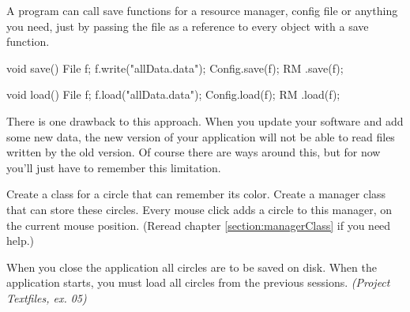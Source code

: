 A program can call save functions for a resource manager, config file or anything you need, just by passing the file as a reference to every object with a save function. 

\begin{code}
void save() {
  File f;
	f.write("allData.data");
	Config.save(f);
	RM    .save(f);
}

void load() {
	File f;
	f.load("allData.data");
	Config.load(f);
	RM    .load(f);
}
\end{code}

\begin{note}
There is one drawback to this approach. When you update your software and add some new data, the new version of your application will not be able to read files written by the old version. Of course there are ways around this, but for now you'll just have to remember this limitation.
\end{note}

\begin{exercise}
Create a class for a circle that can remember its color. Create a manager class that can store these circles. Every mouse click adds a circle to this manager, on the current mouse position. (Reread chapter \ref{section:managerClass} if you need help.)

When you close the application all circles are to be saved on disk. When the application starts, you must load all circles from the previous sessions.
\textsl{(Project Textfiles, ex. 05)}
\end{exercise}


